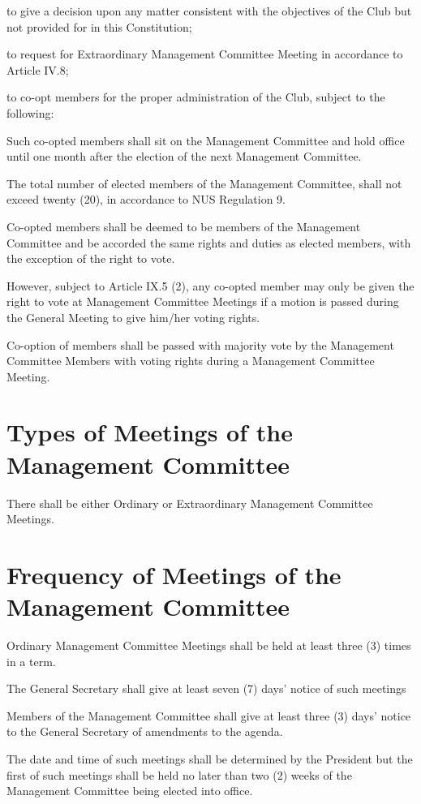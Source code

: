 \begin{legal}
	\item to give a decision upon any matter consistent with the objectives of the Club but not provided for in this Constitution;
	\item to request for Extraordinary Management Committee Meeting in accordance to Article IV.8;
	\item to co-opt members for the proper administration of the Club, subject to the following:
		\begin{legal}
		\item Such co-opted members shall sit on the Management Committee and hold office until one month after the election of the next Management Committee.
		\item The total number of elected members of the Management Committee, shall not exceed twenty (20), in accordance to NUS Regulation 9.
		\item Co-opted members shall be deemed to be members of the Management Committee and be accorded the same rights and duties as elected members, with the exception of the right to vote.
		\item However, subject to Article IX.5 (2), any co-opted member may only be given the right to vote at Management Committee Meetings if a motion is passed during the General Meeting to give him/her voting rights.
		\item Co-option of members shall be passed with majority vote by the Management Committee Members with voting rights during a Management Committee Meeting.
		\end{legal}
	\end{legal}

\section{Types of Meetings of the Management Committee}
There shall be either Ordinary or Extraordinary Management Committee Meetings.

\section{Frequency of Meetings of the Management Committee}
Ordinary Management Committee Meetings shall be held at least three (3) times in a term.
	\begin{legal}
	\item The General Secretary shall give at least seven (7) days' notice of such meetings
	\item Members of the Management Committee shall give at least three (3) days' notice to the General Secretary of amendments to the agenda.
	\item The date and time of such meetings shall be determined by the President but the first of such meetings shall be held no later than two (2) weeks of the Management Committee being elected into office.
	\end{legal}

